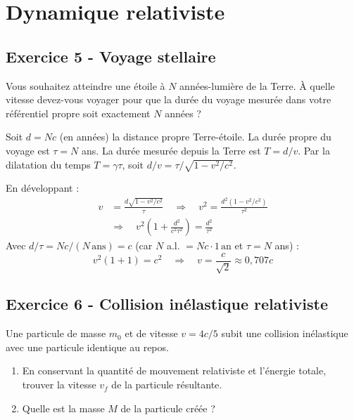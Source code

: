 \documentclass[12pt,a4paper]{article}
\begin{document}
\section{Dynamique relativiste}

\subsection*{Exercice 5 - Voyage stellaire \niveau{\moyen}}

\begin{boiteexercice}
Vous souhaitez atteindre une étoile à $N$ années-lumière de la Terre. À quelle vitesse devez-vous voyager pour que la durée du voyage mesurée dans votre référentiel propre soit exactement $N$ années ?
\end{boiteexercice}

\begin{boitecorrige}
Soit $d = Nc$ (en années) la distance propre Terre-étoile. La durée propre du voyage est $\tau = N$ ans. La durée mesurée depuis la Terre est $T = d/v$. Par la dilatation du temps $T = \gamma\tau$, soit $d/v = \tau/\sqrt{1-v^2/c^2}$.

En développant :
\begin{align*}
v &= \frac{d\sqrt{1-v^2/c^2}}{\tau} \quad\Rightarrow\quad v^2 = \frac{d^2(1-v^2/c^2)}{\tau^2} \\
&\Rightarrow\quad v^2\!\left(1+\frac{d^2}{c^2\tau^2}\right) = \frac{d^2}{\tau^2}
\end{align*}
Avec $d/\tau = Nc/(N\,\text{ans}) = c$ (car $N$ a.l. $= Nc\cdot1\,\text{an}$ et $\tau = N$ ans) :
\[
v^2(1+1) = c^2 \quad\Rightarrow\quad \boxed{v = \frac{c}{\sqrt{2}} \approx 0{,}707c}
\]
\end{boitecorrige}

\subsection*{Exercice 6 - Collision inélastique relativiste \niveau{\moyen}}

\begin{boiteexercice}
Une particule de masse $m_0$ et de vitesse $v = 4c/5$ subit une collision inélastique avec une particule identique au repos.
\begin{enumerate}
  \item En conservant la quantité de mouvement relativiste et l'énergie totale, trouver la vitesse $v_f$ de la particule résultante.
  \item Quelle est la masse $M$ de la particule créée ?
\end{enumerate}
\end{boiteexercice}
\end{document}
